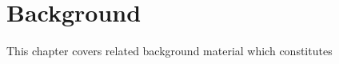 \chapter{Background}\label{C:back} 
This chapter covers related background material which constitutes 